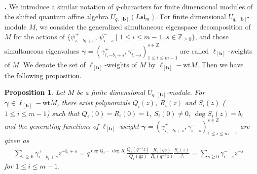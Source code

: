 \documentclass[12pt]{amsart}
\newtheorem{prop}[thm]{Proposition}
\def \para{\refstepcounter{thm} \par\medskip\noindent
                \textbf{\thethm .} }
\numberwithin{equation}{thm}
\newcommand\ZZ{\mathbb Z}
\newcommand\bb{\mathbf b}
\newcommand\g{\gamma}
\newcommand\Bg{\boldsymbol\gamma}
\newcommand{\lbwt}{\operatorname{\ell_{[\bb]}-wt}}
\newcommand\Fsl{\mathfrak{sl}}
\newcounter{ni}
\begin{document}
\para 
We introduce a similar notation of $q$-characters for finite dimensional modules of the shifted quantum affine algebra 
$U_{q,[\bb]} (L\Fsl_m)$. 
For finite dimensional $U_{q,[\bb]}$-module $M$, 
we consider the generalized simultaneous  eigenspace decomposition of $M$ 
for the actions of $\{ \psi_{i, - b_i +s}^+, \, \psi_{i -s}^- \mid 1 \leq i \leq m-1, \, s \in \ZZ_{\geq 0} \} $, 
and those simultaneous eigenvalues 
$\Bg = (\g_{i, - b_i +s}^+, \g_{i,-s}^-)^{s \in \ZZ}_{1 \leq i \leq m-1}$ are called $\ell_{[\bb]}$-weights of $M$. 
We denote the set of $\ell_{[\bb]}$-weights of $M$ by $\lbwt M$. 
Then we have the following proposition. 
\begin{prop}
\label{Prop lb-weight} 
Let $M$ be a finite dimensional $U_{q,[\bb]}$-module. 
For $\Bg \in \lbwt M$, 
there exist polynomials $Q_i(z)$, $R_i(z)$ and $S_i(z)$ ($1 \leq i \leq m-1$) 
such that 
$Q_i(0)=R_i(0)=1$, $S_i ( 0) \not=0$, $\deg S_i(z) =b_i$ 
and the generating functions of $\ell_{[\bb]}$-weight $\Bg = (\g_{i, - b_i +s}^+, \g_{i,-s}^-)^{s\in \ZZ}_{1 \leq i \leq m-1}$ 
are given as 
\begin{align}
\label{ratinal func ellb wt}
\sum_{s \geq 0} \g_{i, - b_i+s}^+ z^{- b_i+s} 
	= q^{\deg Q_i - \deg R_i} \frac{ Q_i ( q^{-1} z)}{ Q_i (q z)} \frac{ R_i (q z)}{ R_i (q^{-1} z)} \frac{ S_i (z) }{ z^{b_i}} 
	= \sum_{ s \geq 0} \g_{i, -s}^- z^{-s} 
\end{align}
for $1 \leq i \leq m-1$. 


\end{prop}
\end{document}
